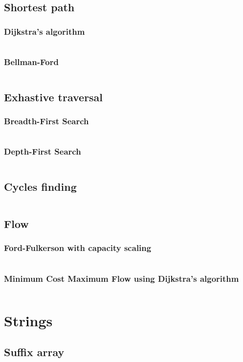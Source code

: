 \documentclass[8pt,a4paper,landscape,oneside]{amsart}
\newcommand{\code}[1]{\inputminted[fontsize=\normalsize,baselinestretch=1]{python}{code/#1}}
\begin{document}
\begin{multicols*}{3}
    \subsection{Shortest path}
        \subsubsection{Dijkstra's algorithm}
            \code{helloworld.py}
        \subsubsection{Bellman-Ford}
            \code{helloworld.py}
    \subsection{Exhastive traversal}
        \subsubsection{Breadth-First Search}
            \code{helloworld.py}
        \subsubsection{Depth-First Search}
            \code{helloworld.py}
    \subsection{Cycles finding}
        \code{helloworld.py}
    \subsection{Flow}
        \subsubsection{Ford-Fulkerson with capacity scaling}
            \code{helloworld.py}
        \subsubsection{Minimum Cost Maximum Flow using Dijkstra's algorithm}
            \code{helloworld.py}

\section{Strings}

    \subsection{Suffix array}
        \code{helloworld.py}

\end{multicols*}
\end{document}
